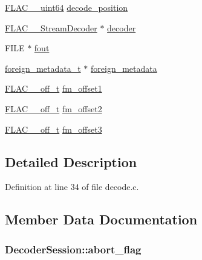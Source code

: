 \begin{DoxyCompactItemize}
\item 
\hyperlink{ordinals_8h_aa78c8c70a3eb8a58af7436f278acde8e}{F\+L\+A\+C\+\_\+\+\_\+uint64} \hyperlink{struct_decoder_session_a407f9244d0f0e751ffefb6b82eda6824}{decode\+\_\+position}
\item 
\hyperlink{struct_f_l_a_c_____stream_decoder}{F\+L\+A\+C\+\_\+\+\_\+\+Stream\+Decoder} $\ast$ \hyperlink{struct_decoder_session_a7ad3408d74fba6de61d43cc7a0f15ebf}{decoder}
\item 
F\+I\+LE $\ast$ \hyperlink{struct_decoder_session_a2b1860c83fb3259314ad92aa9ce7c3c7}{fout}
\item 
\hyperlink{structforeign__metadata__t}{foreign\+\_\+metadata\+\_\+t} $\ast$ \hyperlink{struct_decoder_session_a20a2cb96957df24a1168057dba5a9005}{foreign\+\_\+metadata}
\item 
\hyperlink{libflac_2include_2share_2compat_8h_a125fb0105eee035da35c6a4999d140eb}{F\+L\+A\+C\+\_\+\+\_\+off\+\_\+t} \hyperlink{struct_decoder_session_aef385c730855cf0ebd737df4e7cfd7fc}{fm\+\_\+offset1}
\item 
\hyperlink{libflac_2include_2share_2compat_8h_a125fb0105eee035da35c6a4999d140eb}{F\+L\+A\+C\+\_\+\+\_\+off\+\_\+t} \hyperlink{struct_decoder_session_a0ea4201334a3b7e2e9e0052dd8411948}{fm\+\_\+offset2}
\item 
\hyperlink{libflac_2include_2share_2compat_8h_a125fb0105eee035da35c6a4999d140eb}{F\+L\+A\+C\+\_\+\+\_\+off\+\_\+t} \hyperlink{struct_decoder_session_acbaec2e434d569f6b114ae63b9c46399}{fm\+\_\+offset3}
\end{DoxyCompactItemize}


\subsection{Detailed Description}


Definition at line 34 of file decode.\+c.



\subsection{Member Data Documentation}
\subsubsection[{\texorpdfstring{abort\+\_\+flag}{abort_flag}}]{ Decoder\+Session\+::abort\+\_\+flag}\hypertarget{struct_decoder_session_a89f7322f0fd8d5492bd63401acf37cb1}{}\label{struct_decoder_session_a89f7322f0fd8d5492bd63401acf37cb1}


